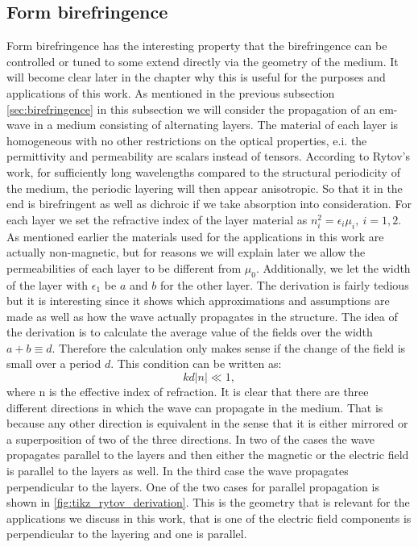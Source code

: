\subsection{Form birefringence}
\label{sec:form_birefringence}
Form birefringence has the interesting property that the birefringence can be controlled or tuned to some extend directly via the geometry of the medium. It will become clear later in the chapter why this is useful for the purposes and applications of this work. As mentioned in the previous subsection \ref{sec:birefringence} in this subsection we will consider the propagation of an em-wave in a medium consisting of alternating layers. The material of each layer is homogeneous with no other restrictions on the optical properties, e.i. the permittivity and permeability are scalars instead of tensors. According to Rytov's work, for sufficiently long wavelengths compared to the structural periodicity of the medium, the periodic layering will then appear anisotropic. So that it in the end is birefringent as well as dichroic if we take absorption into consideration. For each layer we set the refractive index of the layer material as $n_i^2 = \epsilon_i \mu_i, \: i=1,2$. As mentioned earlier the materials used for the applications in this work are actually non-magnetic, but for reasons we will explain later we allow the permeabilities of each layer to be different from $\mu_0$. Additionally, we let the width of the layer with $\epsilon_1$ be $a$ and $b$ for the other layer. The derivation is fairly tedious but it is interesting since it shows which approximations and assumptions are made as well as how the wave actually propagates in the structure. The idea of the derivation is to calculate the average value of the fields over the width $a+b\equiv d$. Therefore the calculation only makes sense if the change of the field is small over a period $d$. This condition can be written as:
\begin{equation}
    \label{eq:rytov_cond1}
    kd|n|\ll 1,
\end{equation}
where n is the effective index of refraction. It is clear that there are three different directions in which the wave can propagate in the medium. That is because any other direction is equivalent in the sense that it is either mirrored or a superposition of two of the three directions. In two of the cases the wave propagates parallel to the layers and then either the magnetic or the electric field is parallel to the layers as well. In the third case the wave propagates perpendicular to the layers. One of the two cases for parallel propagation is shown in \ref{fig:tikz_rytov_derivation}. This is the geometry that is relevant for the applications we discuss in this work, that is one of the electric field components is perpendicular to the layering and one is parallel. 

